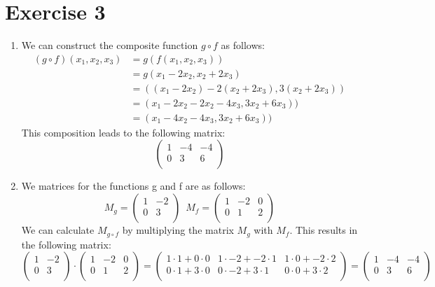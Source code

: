 \documentclass[a4paper]{article}
\begin{document}
\section*{Exercise 3}
\begin{enumerate}
  \item We can construct the composite function $g \circ f$ as follows:
  \begin{align*}
    (g \circ f)(x_1, x_2, x_3)  &= g(f(x_1, x_2, x_3)) \\
                                &= g(x_1 - 2x_2, x_2 + 2x_3) \\
                                &= ((x_1 - 2x_2) - 2(x_2 + 2x_3), 3(x_2 + 2x_3)) \\
                                &= (x_1 - 2x_2 - 2x_2 - 4x_3, 3x_2 + 6x_3)) \\
                                &= (x_1 - 4x_2 - 4x_3, 3x_2 + 6x_3))
  \end{align*}
  This composition leads to the following matrix:
  \[
  \left(
  \begin{array}{ccc}
  1 & -4 & -4 \\
  0 & 3 & 6 \\
  \end{array}
  \right)
  \]
  \item We matrices for the functions g and f are as follows:
  \[
  M_g =
  \left(
  \begin{array}{cc}
  1 & -2 \\
  0 & 3 \\
  \end{array}
  \right)
  \enspace
  M_f =
  \left(
  \begin{array}{ccc}
  1 & -2 & 0 \\
  0 & 1 & 2 \\
  \end{array}
  \right)
  \]
  We can calculate $M_{g \circ f}$ by multiplying the matrix $M_g$ with $M_f$. This results in the following matrix:
  \[
  \left(
  \begin{array}{cc}
  1 & -2 \\
  0 & 3 \\
  \end{array}
  \right)
  \cdot
  \left(
  \begin{array}{ccc}
  1 & -2 & 0 \\
  0 & 1 & 2 \\
  \end{array}
  \right)
  =
  \left(
  \begin{array}{ccc}
  1 \cdot 1 + 0 \cdot 0 & 1 \cdot - 2 + - 2 \cdot 1 & 1 \cdot 0 + - 2 \cdot 2  \\
  0 \cdot 1 + 3 \cdot 0 & 0 \cdot - 2 + 3 \cdot 1 & 0 \cdot 0 + 3 \cdot 2  \\
  \end{array}
  \right)
  =
  \left(
  \begin{array}{ccc}
  1 & -4 & -4 \\
  0 & 3 & 6 \\
  \end{array}
  \right)
  \]
\end{enumerate}
\end{document}
